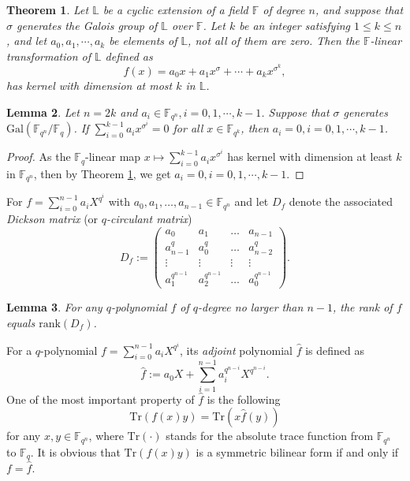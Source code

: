 \documentclass{amsart}
\theoremstyle{plain}
\newtheorem{theorem}{Theorem}[section]
\newtheorem{lemma}[theorem]{Lemma}
\theoremstyle{definition}
\newcommand{\F}{\mathbb F}
\newcommand{\fqn}{\mathbb{F}_{q^n}}
\newcommand{\fqk}{\mathbb{F}_{q^k}}
\newcommand{\fq}{\mathbb{F}_{q}}
\newcommand{\rank}{\mathrm{rank}}
\newcommand{\Gal}{\mathrm{Gal}}
\newcommand{\Tr}{ \ensuremath{ \mathrm{Tr}}}
\begin{document}
	\begin{theorem}\label{th:Gow}\cite[Theorem 5]{gow_galois_2009}	
		Let $\mathbb{L}$ be a cyclic extension of a field $\F$ of degree $n$, and suppose that $\sigma$ generates the Galois group of $\mathbb{L}$ over $\F$. Let $k$
		be an integer satisfying $1 \leq k \leq n$, and let $a_0, a_1,\cdots, a_k$ be elements of $\mathbb{L}$,
		not all of them are zero. Then the $\F$-linear transformation of $\mathbb{L}$ defined as
		$$f(x)=a_0x+a_1x^{\sigma}+\cdots+a_kx^{\sigma^k},$$
		has kernel with dimension at most $k$ in $\mathbb{L}$.
	\end{theorem}
	\begin{lemma}\label{le:k,a_i}
		Let $n=2k$ and $a_i\in\fqn,i=0,1,\cdots, k-1$. Suppose that $\sigma$ generates $\Gal(\fqn/\fq)$. If  $\sum_{i=0}^{k-1}a_ix^{\sigma^i}=0$ for all $x\in\fqk$, then $a_i=0,i=0,1,\cdots, k-1$.		
	\end{lemma}
	\begin{proof}
		As the $\F_q$-linear map $x\mapsto\sum_{i=0}^{k-1}a_ix^{\sigma^i}$ has kernel with dimension at least $k$ in $\fqn$, then by Theorem \ref{th:Gow}, we get $a_i=0,i=0,1,\cdots, k-1$.
	\end{proof}
	For $f=\sum_{i=0}^{n-1}a_i X^{q^i}$ with $a_0,a_1,\ldots,a_{n-1}\in\F_{q^n}$ and let $D_f$ denote the associated \emph{Dickson matrix} (or \emph{$q$-circulant matrix})
	\[D_f:=
	\begin{pmatrix}
		a_0 & a_1 & \ldots & a_{n-1} \\
		a_{n-1}^q & a_0^q & \ldots & a_{n-2}^q \\
		\vdots & \vdots & \vdots & \vdots \\
		a_1^{q^{n-1}} & a_2^{q^{n-1}} & \ldots & a_0^{q^{n-1}}
	\end{pmatrix}.
	\]
	
	\begin{lemma}\cite[Proposition 4.4]{wu_linearized_2013}\label{lem:dickson_rank}
		For any $q$-polynomial $f$ of $q$-degree no larger than $n-1$, the rank of $f$ equals $\rank(D_f)$.
	\end{lemma}
	
	For a $q$-polynomial $f = \sum_{i=0}^{n-1} a_i X^{q^i}$, its \emph{adjoint} polynomial $\hat{f}$  is defined as
	\[
	\hat{f} := a_0X + \sum_{i=1}^{n-1} a_i^{q^{n-i}} X^{q^{n-i}}. 
	\]
	One of the most important property of $\hat{f}$ is the following
	\[
	\Tr(f(x)y) = \Tr(x\hat{f}(y))
	\]
	for any $x,y\in \fqn$, where $\Tr(\cdot)$ stands for the absolute trace function from $\fqn $ to $\F_q$. It is obvious that $\Tr(f(x)y)$ is a symmetric bilinear form if and only if $f=\hat{f}$.
	
\end{document}
